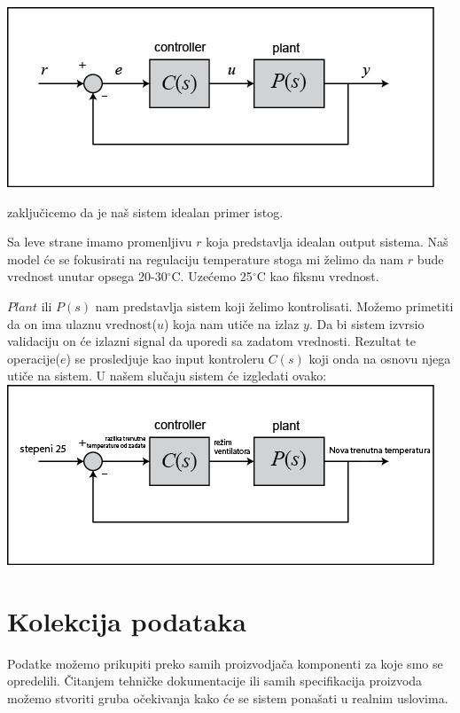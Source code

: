 \documentclass[a4paper,11pt]{book}
\begin{document}
\includegraphics[width=\textwidth]{feedback_block.png}

zaključicemo da je naš sistem idealan primer istog.

Sa leve strane imamo promenljivu $r$ koja predstavlja idealan output sistema. Naš model će se fokusirati na regulaciju temperature stoga mi želimo da nam $r$ bude vrednost unutar opsega 20-30$^\circ$C. Uzećemo 25$^\circ$C kao fiksnu vrednost. 

$Plant$ ili $P(s)$ nam predstavlja sistem koji želimo kontrolisati. Možemo primetiti da on ima ulaznu vrednost($u$) koja nam utiče na izlaz $y$. Da bi sistem izvrsio validaciju on će izlazni signal da uporedi sa zadatom vrednosti. Rezultat te operacije($e$) se prosledjuje kao input kontroleru $C(s)$ koji onda na osnovu njega utiče na sistem. U našem slučaju sistem će izgledati ovako:\\

\includegraphics[width=\textwidth]{feedback.png}



\section{Kolekcija podataka}

Podatke možemo prikupiti preko samih proizvodjača komponenti za koje smo se opredelili. Čitanjem tehničke dokumentacije ili samih specifikacija proizvoda možemo stvoriti gruba očekivanja kako će se sistem ponašati u realnim uslovima. \\
\end{document}
